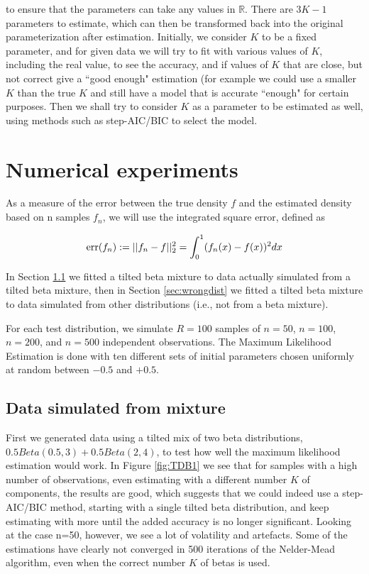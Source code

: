 \noindent
to ensure that the parameters can take any values in $\mathbb{R}$. There are $3K-1$ parameters to estimate, which can then be transformed back into the original parameterization after estimation. Initially, we consider $K$ to be a fixed parameter, and for given data we will try to fit with various values of $K$, including the real value, to see the accuracy, and if values of $K$ that are close, but not correct give a ``good enough" estimation (for example we could use a smaller $K$ than the true $K$ and still have a model that is accurate ``enough" for certain purposes. Then we shall try to consider $K$ as a parameter to be estimated as well, using methods such as step-AIC/BIC to select the model.

\section{Numerical experiments}



As a measure of the error between the true density $f$ and the estimated density based on n samples $f_n$, we will use the integrated square error, defined as

$$
{\rm err}(f_n) := ||f_n - f||^2_2 = \int_0^1(f_n(x)-f(x))^2dx
$$

In Section \ref{sec:truedist} we fitted a tilted beta mixture to data actually simulated from a tilted beta mixture, then in Section \ref{sec:wrongdist} we fitted a tilted beta mixture to data simulated from other distributions (i.e., not from a beta mixture).

For each test distribution, we simulate $R=100$ samples of $n=50$, $n=100$, $n=200$, and $n=500$ independent observations. The Maximum Likelihood Estimation is done with ten different sets of initial parameters chosen uniformly at random between $-0.5$ and $+0.5$.

\subsection{Data simulated from mixture}
\label{sec:truedist}

First we generated data using a tilted mix of two beta distributions, $0.5Beta(0.5,3) + 0.5Beta(2,4)$, to test how well the maximum likelihood estimation would work. In Figure \ref{fig:TDB1} we see that for samples with a high number of observations, even estimating with a different number $K$ of components, the results are good, which suggests that we could indeed use a step-AIC/BIC method, starting with a single tilted beta distribution, and keep estimating with more until the added accuracy is no longer significant. Looking at the case n=50, however, we see a lot of volatility and artefacts. Some of the estimations have clearly not converged in 500 iterations of the Nelder-Mead algorithm, even when the correct number $K$ of betas is used.
\\

